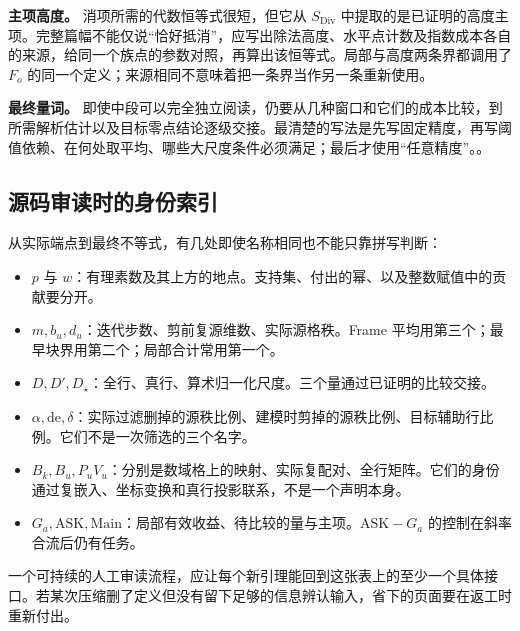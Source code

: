 \textbf{主项高度。} 消项所需的代数恒等式很短，但它从 $S_{\mathrm{Div}}$ 中提取的是已证明的高度主项。完整篇幅不能仅说“恰好抵消”，应写出除法高度、水平点计数及指数成本各自的来源，给同一个族点的参数对照，再算出该恒等式。局部与高度两条界都调用了 $F_o$ 的同一个定义；来源相同不意味着把一条界当作另一条重新使用。

\textbf{最终量词。} 即使中段可以完全独立阅读，仍要从几种窗口和它们的成本比较，到所需解析估计以及目标零点结论逐级交接。最清楚的写法是先写固定精度，再写阈值依赖、在何处取平均、哪些大尺度条件必须满足；最后才使用“任意精度”。。

\subsection{源码审读时的身份索引}
从实际端点到最终不等式，有几处即使名称相同也不能只靠拼写判断：
\begin{itemize}
\item $p$ 与 $w$：有理素数及其上方的地点。支持集、付出的幂、以及整数赋值中的贡献要分开。
\item $m,b_u,d_u$：迭代步数、剪前复源维数、实际源格秩。Frame 平均用第三个；最早块界用第二个；局部合计常用第一个。
\item $D,D',D_\star$：全行、真行、算术归一化尺度。三个量通过已证明的比较交接。
\item $\alpha,\mathrm{de},\delta$：实际过滤删掉的源秩比例、建模时剪掉的源秩比例、目标辅助行比例。它们不是一次筛选的三个名字。
\item $B_k,B_u,P_uV_u$：分别是数域格上的映射、实际复配对、全行矩阵。它们的身份通过复嵌入、坐标变换和真行投影联系，不是一个声明本身。
\item $G_a,\mathrm{ASK},\mathrm{Main}$：局部有效收益、待比较的量与主项。$\mathrm{ASK}-G_a$ 的控制在斜率合流后仍有任务。
\end{itemize}
一个可持续的人工审读流程，应让每个新引理能回到这张表上的至少一个具体接口。若某次压缩删了定义但没有留下足够的信息辨认输入，省下的页面要在返工时重新付出。
